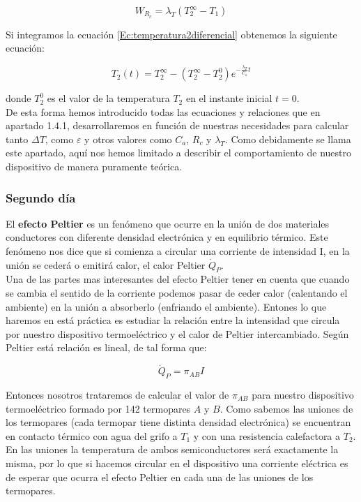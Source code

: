 \documentclass[12pt,a4paper]{article}
\begin{document}
\begin{equation}
W_{R_c} = \lambda_T  (T_2^{\infty} - T_1)
\label{Ec:lambda}
\end{equation}



Si integramos la ecuación \ref{Ec:temperatura2diferencial} obtenemos la siguiente ecuación:

\begin{equation}
T_2 (t) = T_2^{\infty} - (T_2^{\infty} - T_2^0) e^{-\frac{\lambda_T}{C_a}t}
\label{Ec:temperatura2}
\end{equation}

donde $T_2^0$ es el valor de la temperatura $T_2$ en el instante inicial $t=0$. \\

De esta forma hemos introducido todas las ecuaciones y relaciones que en apartado 1.4.1, desarrollaremos en función de nuestras necesidades para calcular tanto $\Delta T$, como $\varepsilon$ y otros valores como $C_a$, $R_c$ y $\lambda_T$. Como debidamente se llama este apartado, aquí nos hemos limitado a describir el comportamiento de nuestro dispositivo de manera puramente teórica. 

\subsubsection{Segundo día}

El \textbf{efecto Peltier} es un fenómeno que ocurre en la unión de dos materiales conductores con diferente densidad electrónica y en equilibrio térmico. Este fenómeno nos dice que si comienza a circular una corriente de intensidad I, en la unión se cederá o emitirá calor, el calor Peltier $\dot{Q}_P$. \\


Una de las partes mas interesantes del efecto Peltier tener en cuenta que cuando se cambia el sentido de la corriente podemos pasar de ceder calor (calentando el ambiente) en la unión a absorberlo (enfriando el ambiente). Entones lo que haremos en está práctica es estudiar la relación entre la intensidad que circula por nuestro dispositivo termoeléctrico y el calor de Peltier intercambiado. Según Peltier está relación es lineal, de tal forma que:

\begin{equation}
\dot{Q}_P = \pi_{AB} I
\label{Ec:efectopeltier}
\end{equation} 

Entonces nosotros trataremos de calcular el valor de $\pi_{AB}$ para nuestro dispositivo termoeléctrico formado por 142 termopares $A$ y $B$. Como sabemos las uniones de los termopares (cada termopar tiene distinta densidad electrónica) se encuentran en contacto térmico con agua del grifo a $T_1$ y con una resistencia calefactora a $T_2$. En las uniones la temperatura de ambos semiconductores será exactamente la misma, por lo que si hacemos circular en el dispositivo una corriente eléctrica es de esperar que ocurra el efecto Peltier en cada una de las uniones de los termopares. \\
\end{document}
